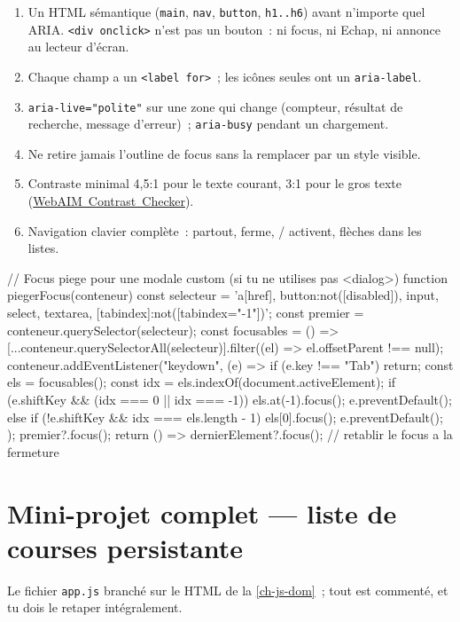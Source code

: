 \documentclass[12pt,a4paper,twoside,openright]{book}
\newcommand{\fichier}[1]{\texttt{\color{pathgreen}#1}}
\newcommand{\link}[2]{\href{#2}{#1}}
\begin{document}
\begin{enumerate}
  \item Un HTML s\'emantique (\verb|main|, \verb|nav|, \verb|button|, \verb|h1..h6|) avant
        n'importe quel ARIA. \verb|<div onclick>| n'est pas un bouton~: ni focus, ni Echap,
        ni annonce au lecteur d'\'ecran.
  \item Chaque champ a un \verb|<label for>|~; les ic\^ones seules ont un \verb|aria-label|.
  \item \verb|aria-live="polite"| sur une zone qui change (compteur, r\'esultat de recherche,
        message d'erreur)~; \verb|aria-busy| pendant un chargement.
  \item Ne retire jamais l'outline de focus sans la remplacer par un style visible.
  \item Contraste minimal 4{,}5:1 pour le texte courant, 3:1 pour le gros texte
        (\link{WebAIM~Contrast~Checker}{https://webaim.org/resources/contrastchecker/}).
  \item Navigation clavier compl\`ete~:  partout,  ferme,
        / activent, fl\`eches dans les listes.
\end{enumerate}

\begin{codejs}
// Focus piege pour une modale custom (si tu ne utilises pas <dialog>)
function piegerFocus(conteneur) {
  const selecteur = 'a[href], button:not([disabled]), input, select, textarea, [tabindex]:not([tabindex="-1"])';
  const premier = conteneur.querySelector(selecteur);
  const focusables = () => [...conteneur.querySelectorAll(selecteur)].filter((el) => el.offsetParent !== null);
  conteneur.addEventListener("keydown", (e) => {
    if (e.key !== "Tab") return;
    const els = focusables();
    const idx = els.indexOf(document.activeElement);
    if (e.shiftKey && (idx === 0 || idx === -1)) { els.at(-1).focus(); e.preventDefault(); }
    else if (!e.shiftKey && idx === els.length - 1) { els[0].focus(); e.preventDefault(); }
  });
  premier?.focus();
  return () => dernierElement?.focus();       // retablir le focus a la fermeture
}
\end{codejs}

\section{Mini-projet complet --- liste de courses persistante}

Le fichier \fichier{app.js} branch\'e sur le HTML de la \cref{ch-js-dom}~; tout est comment\'e,
et tu dois le retaper int\'egralement.
\end{document}
